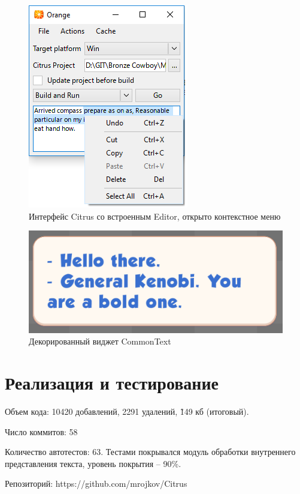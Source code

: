 \documentclass{fefu}
\begin{document}
			\begin{figure}[H]
				\centering
				\includegraphics[width=0.5\linewidth]{images/EditorContextMenu.png}
				\caption{Интерфейс Citrus со встроенным Editor, открыто контекстное меню}
			\end{figure}
			\begin{figure}[H]
				\centering
				\includegraphics[width=1\linewidth]{images/DecoratedBubble.png}
				\caption{Декорированный виджет CommonText}
			\end{figure}
	\section{Реализация и тестирование}
		\par Объем кода: 10420 добавлений, 2291 удалений, \~149 кб (итоговый).
		\par Число коммитов: 58
		\par Количество автотестов: 63. Тестами покрывался модуль обработки внутреннего 
		представления текста, уровень покрытия -- 90\%.
		\par Репозиторий: https://github.com/mrojkov/Citrus
\end{document}
